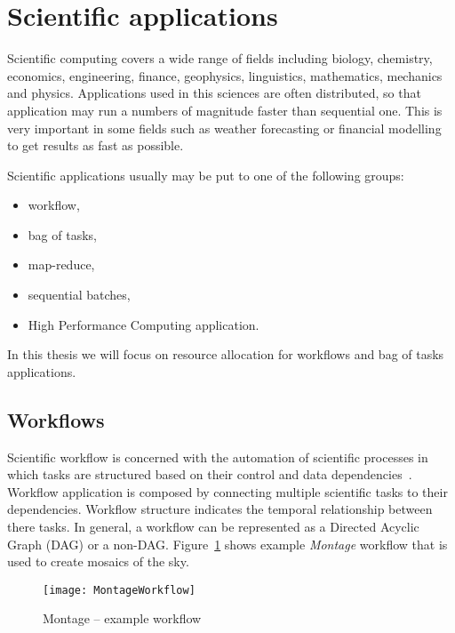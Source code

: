 \section{Scientific applications}
\label{intro:application}

Scientific computing covers a wide range of fields including biology, chemistry, economics, engineering, finance, geophysics, linguistics, mathematics, mechanics and physics. Applications used in this sciences are often distributed, so that application may run a numbers of magnitude faster than sequential one. This is very important in some fields such as weather forecasting or financial modelling to get results as fast as possible. 

Scientific applications usually may be put to one of the following groups: 
\begin{itemize}
  \item workflow,
  \item bag of tasks,
  \item map-reduce,  
  \item sequential batches,
  \item High Performance Computing application.
\end{itemize}

In this thesis we will focus on resource allocation for workflows and bag of tasks applications.

\subsection{Workflows}
\label{intro:workflow}

Scientific workflow is concerned with the automation of scientific processes in which tasks are structured based on their control and data dependencies~\cite{Taylor:2006:WES:1196459}. Workflow application is composed by connecting multiple scientific tasks to their dependencies. Workflow structure indicates the temporal relationship between there tasks. In general, a workflow can be represented as a Directed Acyclic Graph (DAG) or a non-DAG. Figure~\ref{fig:intro:workflow} shows example \emph{Montage} workflow that is used to create mosaics of the sky.

\begin{figure}[tb]
   \centering
   \texttt{[image: MontageWorkflow]}  
   \caption{Montage – example workflow~\cite{Bharathi08}}
   \label{fig:intro:workflow}
\end{figure} 


